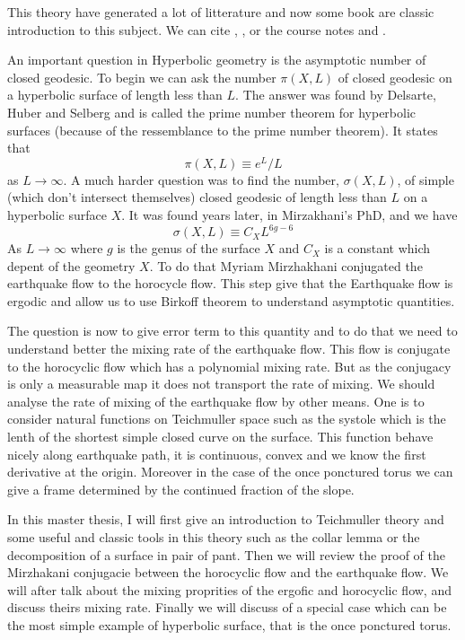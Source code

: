 This theory have generated a lot of litterature and now some book are classic introduction to this subject. We can cite \cite{farb2011primer}, \cite{hubbardhal01297628}, \cite{kapovich2009hyperbolic} or the course notes \cite{Mcmullen1998HyperbolicM} and \cite{Mcmullen1998Riemann}.

\vspace{10 px}

An important question in Hyperbolic geometry is the asymptotic number of closed geodesic. To begin we can ask the number $\pi(X,L)$ of closed geodesic on a hyperbolic surface of length less than $L$. The answer was found by Delsarte, Huber and Selberg \cite{buser2010geometry}
 and is called the prime number theorem for hyperbolic surfaces (because of the ressemblance to the prime number theorem). It states that \[
\pi(X,L) \equiv e^{L} / L
\]
as $L \to \infty$.
A much harder question was to find the number, $\sigma(X,L)$, of simple (which don't intersect themselves) closed geodesic of length less than $L$ on a hyperbolic surface $X$. It was found years later, in Mirzakhani's PhD, and we have \[
\sigma(X,L) \equiv C_{X}L^{6g-6}
\]
As $L \to \infty$ where $g$ is the genus of the surface $X$ and $C_{X}$ is a constant which depent of the geometry $X$.
To do that Myriam Mirzhakhani conjugated the earthquake flow to the horocycle flow. This step give that the Earthquake flow is ergodic and allow us to use Birkoff theorem to understand asymptotic quantities.

\vspace{10 px}

The question is now to give error term to this quantity and to do that we need to understand better the mixing rate of the earthquake flow. This flow is conjugate to the horocyclic flow which has a polynomial mixing rate. But as the conjugacy is only a measurable map it does not transport the rate of mixing. We should analyse the rate of mixing of the earthquake flow by other means. One is to consider natural functions on Teichmuller space such as the systole which is the lenth of the shortest simple closed curve on the surface. This function behave nicely along earthquake path, it is continuous, convex and we know the first derivative at the origin. Moreover in the case of the once ponctured torus we can
give a frame determined by the continued fraction of the slope.

\vspace{10 px}

In this master thesis, I will first give an introduction to Teichmuller theory and some useful and classic tools in this theory such as the collar lemma or the decomposition of a surface in pair of pant. Then we will review the proof of the Mirzhakani conjugacie between the horocyclic flow and the earthquake flow. We will after talk about the mixing proprities of the ergofic and horocyclic flow, and discuss theirs mixing rate. Finally we will discuss of a special case which can be the most simple example of hyperbolic surface, that is the once ponctured torus.
